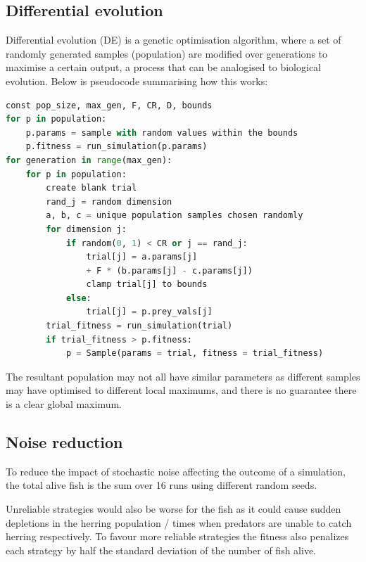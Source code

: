 \documentclass[12pt]{article}
\begin{document}
\subsection{Differential evolution}
Differential evolution (DE) is a genetic optimisation algorithm, where a set of randomly generated samples (population) are modified over generations to maximise a certain output, a process that can be analogised to biological evolution. Below is pseudocode summarising how this works:
\pagebreak
\begin{lstlisting}[language=Python]
const pop_size, max_gen, F, CR, D, bounds
for p in population:
    p.params = sample with random values within the bounds
    p.fitness = run_simulation(p.params)
for generation in range(max_gen):
    for p in population:
        create blank trial
        rand_j = random dimension
        a, b, c = unique population samples chosen randomly
        for dimension j:
            if random(0, 1) < CR or j == rand_j:
                trial[j] = a.params[j]
                + F * (b.params[j] - c.params[j])
                clamp trial[j] to bounds
            else:
                trial[j] = p.prey_vals[j]
        trial_fitness = run_simulation(trial)
        if trial_fitness > p.fitness:
            p = Sample(params = trial, fitness = trial_fitness)        
\end{lstlisting}
The resultant population may not all have similar parameters as different samples may have optimised to different local maximums, and there is no guarantee there is a clear global maximum.
\subsection{Noise reduction}
To reduce the impact of stochastic noise affecting the outcome of a simulation, the total alive fish is the sum over 16 runs using different random seeds.\par
Unreliable strategies would also be worse for the fish as it could cause sudden depletions in the herring population / times when predators are unable to catch herring respectively. To favour more reliable strategies the fitness also penalizes each strategy by half the standard deviation of the number of fish alive.
\end{document}
